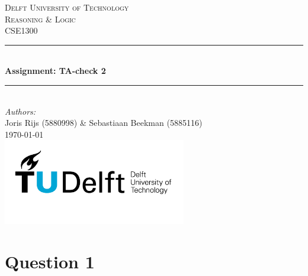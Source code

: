 \documentclass[a4paper]{article}
\begin{document}
\begin{titlepage}
    \newcommand{\HRule}{\rule{\linewidth}{0.5mm}}
    \center

    \textsc{\LARGE Delft University of Technology}\\[1cm]

    \textsc{\Large Reasoning \& Logic}\\[0.2cm]
    \textsc{\large CSE1300}\\[1cm]
    \HRule \\[0.8cm]
    { \huge \bfseries Assignment: TA-check 2}\\[0.7cm]
    \HRule \\[2cm]
    \large
    \emph{Authors:}\\
    Joris Rijs (5880998) \& Sebastiaan Beekman (5885116)\\[1.5cm]
    {\large \today}\\[5cm]
    \includegraphics[width=0.6\textwidth]{images/TU_delft_logo.jpg}\\[1cm]
    \vfill
\end{titlepage}

\newpage
\tableofcontents

\newpage
\section{Question 1}
\end{document}
